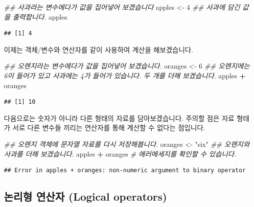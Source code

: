 \documentclass[]{book}
\newenvironment{Shaded}{\begin{snugshade}}{\end{snugshade}}
\newcommand{\CommentTok}[1]{\textcolor[rgb]{0.56,0.35,0.01}{\textit{#1}}}
\newcommand{\DecValTok}[1]{\textcolor[rgb]{0.00,0.00,0.81}{#1}}
\newcommand{\NormalTok}[1]{#1}
\newcommand{\OperatorTok}[1]{\textcolor[rgb]{0.81,0.36,0.00}{\textbf{#1}}}
\newcommand{\StringTok}[1]{\textcolor[rgb]{0.31,0.60,0.02}{#1}}
\begin{document}
\begin{Shaded}
\begin{Highlighting}[]
\CommentTok{## 사과라는 변수에다가 값을 집어넣어 보겠습니다}
\NormalTok{apples <-}\StringTok{ }\DecValTok{4}
\CommentTok{## 사과에 담긴 값을 출력합니다.}
\NormalTok{apples}
\end{Highlighting}
\end{Shaded}

\begin{verbatim}
## [1] 4
\end{verbatim}

이제는 객체/변수와 연산자를 같이 사용하여 계산을 해보겠습니다.

\begin{Shaded}
\begin{Highlighting}[]
\CommentTok{## 오렌지라는 변수에다가 값을 집어넣어 보겠습니다.}
\NormalTok{oranges <-}\StringTok{ }\DecValTok{6} 
\CommentTok{## 오렌지에는 6이 들어가 있고 사과에는 4가 들어가 있습니다. 두 개를 더해 보겠습니다.}
\NormalTok{apples }\OperatorTok{+}\StringTok{ }\NormalTok{oranges}
\end{Highlighting}
\end{Shaded}

\begin{verbatim}
## [1] 10
\end{verbatim}

다음으로는 숫자가 아니라 다른 형태의 자료를 담아보겠습니다. 주의할 점은 자료 형태가 서로 다른 변수들 끼리는 연산자를 통해 계산할 수 없다는 점입니다.

\begin{Shaded}
\begin{Highlighting}[]
\CommentTok{## 오렌지 객체에 문자열 자료를 다시 저장해봅니다.}
\NormalTok{oranges <-}\StringTok{ "six"} 
\CommentTok{## 오렌지와 사과를 더해 보겠습니다.}
\NormalTok{apples }\OperatorTok{+}\StringTok{ }\NormalTok{oranges }\CommentTok{# 에러메세지를 확인할 수 있습니다.}
\end{Highlighting}
\end{Shaded}

\begin{verbatim}
## Error in apples + oranges: non-numeric argument to binary operator
\end{verbatim}

\hypertarget{uxb17cuxb9acuxd615-uxc5f0uxc0b0uxc790-logical-operators}{%
\subsection{논리형 연산자 (Logical operators)}\label{uxb17cuxb9acuxd615-uxc5f0uxc0b0uxc790-logical-operators}}
\end{document}
